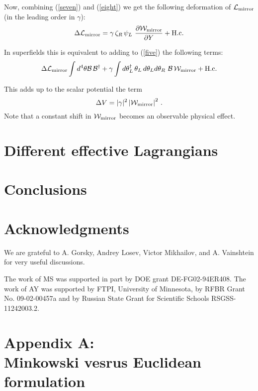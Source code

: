 \documentclass[epsfig,12pt]{article}
\def\beq{\begin{equation}}
\def\eeq{\end{equation}}
\renewcommand{\theequation}{\thesection.\arabic{equation}}
\def\beq{\begin{equation}}
\def\eeq{\end{equation}}
\renewcommand{\theequation}{\thesection.\arabic{equation}}
\begin{document}
{Now, combining (\ref{seven}) and (\ref{eight})
we get the following deformation of ${\mathcal L}_{\rm mirror}$ (in the leading order in $\gamma$):
\beq
\Delta {\mathcal L}_{\rm mirror}= \gamma \, \zeta_R \,\psi_L\,\, \frac{\partial {\mathcal W}_{\rm mirror}}{\partial Y}
+{\rm H.c.}
\eeq

In superfields this is equivalent to adding to (\ref{five}) the following terms:
\beq
\Delta {\mathcal L}_{\rm mirror}  \int d^4\theta {\mathcal B}\, {\mathcal B}^\dagger 
+\gamma \int d\theta_L^\dagger\, \theta_L \,d\theta_L  d\theta_R\,\, {\mathcal B} \,{\mathcal W}_{\rm mirror}
+{\rm H.c.}
\eeq

This adds up to the scalar potential the term 
\beq
\Delta V = |\gamma|^2 \left|{\mathcal W}_{\rm mirror}\right|^2\,.
\eeq
Note that a constant shift in ${\mathcal W}_{\rm mirror}$
becomes an observable physical effect.

\newpage

\section{Different effective Lagrangians}


\newpage

\section{Conclusions}


\section*{Acknowledgments}

We are grateful to A. Gorsky, Andrey Losev, Victor Mikhailov, and A. Vainshtein for very useful discussions.

The work of MS was supported in part by DOE grant DE-FG02-94ER408. 
The work of AY was  supported 
by  FTPI, University of Minnesota, 
by RFBR Grant No. 09-02-00457a 
and by Russian State Grant for 
Scientific Schools RSGSS-11242003.2.




\newpage

\section*{Appendix A: \\
Minkowski vesrus Euclidean formulation}
 \renewcommand{\theequation}{A.\arabic{equation}}
\setcounter{equation}{0}
 
}
\end{document}
